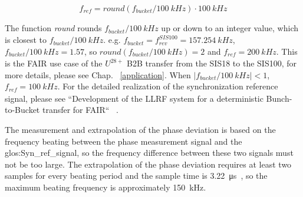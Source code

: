 \begin{equation}
\label{round}
	f_\mathit{ref}=\textit{round} (f_{\mathit{bucket}}/\SI{100}{kHz})\cdot \SI{100}{kHz}
\end{equation}

The function \textit{round} rounds $f_{\mathit{bucket}}/\SI{100}{kHz}$ up or down to an integer value, which is closest to $f_{\mathit{bucket}}/\SI{100}{kHz}$. e.g. $f_{\mathit{bucket}}=f_\mathit{rev}^{SIS100}=\SI{157.254}{kHz}$, $f_{\mathit{bucket}}/\SI{100}{kHz}=1.57$, so $\textit{round} (f_{\mathit{bucket}}/\SI{100}{kHz})=2$ and $f_\mathit{ref}=\SI{200}{kHz}$. This is the FAIR use case of the $U^{28+}$ B2B transfer from the SIS18 to the SIS100, for more details, please see Chap. ~\ref{application}. When $|f_{\mathit{bucket}}/\SI{100}{kHz}|<1$, $f_\mathit{ref}=\SI{100}{kHz}$.  For the detailed realization of the synchronization reference signal, please see ``Development of the LLRF system for a deterministic Bunch-to-Bucket transfer for FAIR`` ~\cite{ferrand_development_nodate}.

The measurement and extrapolation of the phase deviation is based on the frequency beating between the phase measurement signal and the \gls{glos:Syn_ref_signal}, so the frequency difference between these two signals must not be too large. The extrapolation of the phase deviation requires at least two samples for every beating period and the sample time is \SI{3.22}{\us}~\cite{ferrand_development_nodate}, so the maximum beating frequency is approximately \SI{150}{kHz}. 

 
%
